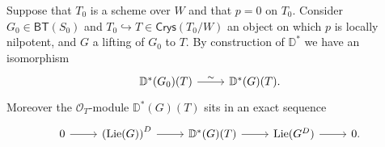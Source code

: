 \documentclass[../Main]{subfiles}
\begin{document}
\begin{rem}[]
	Suppose that $T_0$ is a scheme over $W$ and that $p = 0$ on $T_0$.
	Consider $G_0 \in \mathsf{BT}(S_0)$ and $T_0 \hookrightarrow T \in \mathsf{Crys}(T_0/W)$
	an object on which $p$ is locally nilpotent, and $G$ a lifting of $G_0$ to $T$.
	By construction of $\mathbb{D}^*$ we have an isomorphism
	\begin{equation*}
	\begin{tikzcd}[row sep = 0ex
		,/tikz/column 1/.append style={anchor=base east}
		,/tikz/column 2/.append style={anchor=base west}]
		\mathbb{D}^*(G_0)(T) \arrow[r, "\sim", rightarrow] &
		\mathbb{D}^*(G)(T)
	.\end{tikzcd}
	\end{equation*} 
	Moreover the $\mathcal{O}_{ T }$-module $\mathbb{D}^*(G)(T)$ sits in an exact sequence
	\begin{equation*}
	\begin{tikzcd}
		0 \arrow[r, "", rightarrow] &
		\left( \mathrm{Lie}(G) \right)^D \arrow[r, "", rightarrow] &
		\mathbb{D}^*(G)(T) \arrow[r, "", rightarrow] &
		\mathrm{Lie}(G^D) \arrow[r, "", rightarrow] &
		0
	.\end{tikzcd}
	\end{equation*}
\end{rem}
\end{document}
